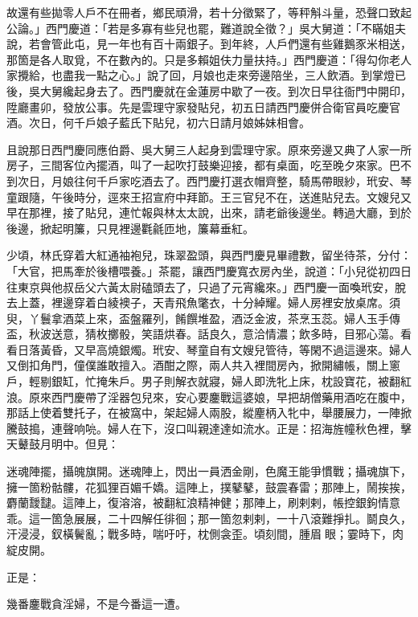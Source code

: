 故還有些拋零人戶不在冊者，鄉民頑滑，若十分徵緊了，等秤斛斗量，恐聲口致起公論。」西門慶道：「若是多寡有些兒也罷，難道說全徵？」吳大舅道：「不瞞姐夫說，若會管此屯，見一年也有百十兩銀子。到年終，人戶們還有些雞鵝豕米相送，那箇是各人取覓，不在數內的。只是多賴姐伕力量扶持。」西門慶道：「得勾你老人家攪給，也盡我一點之心。」說了回，月娘也走來旁邊陪坐，三人飲酒。到掌燈已後，吳大舅纔起身去了。西門慶就在金蓮房中歇了一夜。到次日早往衙門中開印，陞廳畫卯，發放公事。先是雲理守家發貼兒，初五日請西門慶併合衛官員吃慶官酒。次日，何千戶娘子藍氏下貼兒，初六日請月娘姊妹相會。

且說那日西門慶同應伯爵、吳大舅三人起身到雲理守家。原來旁邊又典了人家一所房子，三間客位內擺酒，叫了一起吹打鼓樂迎接，都有桌面，吃至晚夕來家。巴不到次日，月娘往何千戶家吃酒去了。西門慶打選衣帽齊整，騎馬帶眼紗，玳安、琴童跟隨，午後時分，逕來王招宣府中拜節。王三官兒不在，送進貼兒去。文嫂兒又早在那裡，接了貼兒，連忙報與林太太說，出來，請老爺後邊坐。轉過大廳，到於後邊，掀起明簾，只見裡邊氍毹匝地，簾幕垂紅。

少頃，林氏穿着大紅通袖袍兒，珠翠盈頭，與西門慶見畢禮數，留坐待茶，分付：「大官，把馬牽於後槽喂養。」茶罷，讓西門慶寬衣房內坐，說道：「小兒從初四日往東京與他叔岳父六黃太尉磕頭去了，只過了元宵纔來。」西門慶一面喚玳安，脫去上蓋，裡邊穿着白綾襖子，天青飛魚氅衣，十分綽耀。婦人房裡安放桌席。須臾，丫鬟拿酒菜上來，盃盤羅列，餚饌堆盈，酒泛金波，茶烹玉蕊。婦人玉手傳盃，秋波送意，猜枚擲骰，笑語烘春。話良久，意洽情濃；飲多時，目邪心蕩。看看日落黃昏，又早高燒銀燭。玳安、琴童自有文嫂兒管待，等閑不過這邊來。婦人又倒扣角門，僮僕誰敢擅入。酒酣之際，兩人共入裡間房內，掀開繡帳，關上窻戶，輕剔銀缸，忙掩朱戶。男子則解衣就寢，婦人即洗牝上床，枕設寶花，被翻紅浪。原來西門慶帶了淫器包兒來，安心要鏖戰這婆娘，早把胡僧藥用酒吃在腹中，那話上使着雙托子，在被窩中，架起婦人兩股，縱麈柄入牝中，舉腰展力，一陣掀騰鼓搗，連聲响喨。婦人在下，沒口叫親達達如流水。正是：招海旌幢秋色裡，擊天鼙鼓月明中。但見：

\begin{myquote}
迷魂陣擺，攝魄旗開。迷魂陣上，閃出一員洒金剛，色魔王能爭慣戰；攝魂旗下，擁一箇粉骷髏，花狐狸百媚千嬌。這陣上，撲鼕鼕，鼓震春雷；那陣上，鬧挨挨，麝蘭靉靆。這陣上，復溶溶，被翻紅浪精神健；那陣上，刷剌剌，帳控銀鉤情意乖。這一箇急展展，二十四解任徘徊；那一箇忽剌剌，一十八滾難掙扎。鬬良久，汗浸浸，釵橫鬢亂；戰多時，喘吁吁，枕側衾歪。頃刻間，腫眉𦣘眼；霎時下，肉綻皮開。
\end{myquote}

正是：

\begin{myquote}
幾番鏖戰貪淫婦，不是今番這一遭。
\end{myquote}

